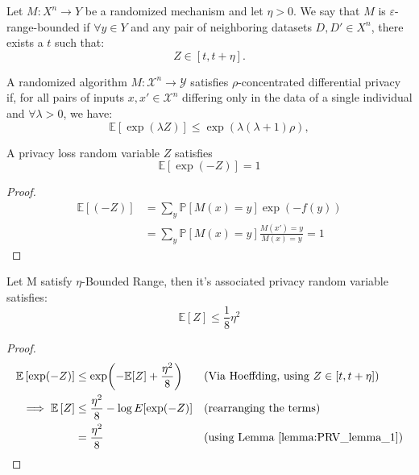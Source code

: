 \documentclass{article}
\begin{document}
\begin{definition}
\label{def:br}
    Let $M : X^n \to Y$ be a randomized mechanism and let $\eta > 0$. 
    We say that $M$ is $\varepsilon$-range-bounded if $\forall y \in Y$ 
    and any pair of neighboring datasets $D, D' \in X^n$, there exists a $t$ such that:
    \begin{equation}
        Z \in \left[t, t + \eta \right].
    \end{equation}
\end{definition}

\begin{definition}
    \label{def:zcdp}
    A randomized algorithm \( M : \mathcal{X}^n \to \mathcal{Y} \) satisfies \(\rho\)-concentrated differential privacy if, for all pairs of inputs \( x, x' \in \mathcal{X}^n \) differing only in the data of a single individual and $\forall \lambda > 0$, we have:
    \begin{equation}
        \mathbb{E}\left[\exp(\lambda Z)\right] \le \exp\left(\lambda(\lambda+1)\rho\right),
    \end{equation}
\end{definition}

\begin{lemma} A privacy loss random variable $Z$ satisfies
    \label{lemma:PRV_lemma_1}
    \begin{equation}
        \mathbb{E}\left[\exp(-Z)\right] = 1
    \end{equation}
    \begin{proof}
    \begin{align}
        \mathbb{E}\left[(-Z)\right] &= \sum_y \mathbb{P}\left[ M(x) = y\right] \exp(-f(y)) \\
        & = \sum_y \mathbb{P}\left[M(x) = y\right] \frac{M(x') = y}{M(x) = y} = 1
    \end{align}
    \end{proof}
\end{lemma}

\begin{lemma} Let M satisfy $\eta$-Bounded Range, then it's associated privacy random variable satisfies:
    \label{lemma:PRV_lemma_2}
    \begin{equation}
        \mathbb{E}\left[Z\right] \leq \frac{1}{8}\eta^2
    \end{equation}

    \begin{proof}
    \begin{align}
        \mathbb{E}\left[\exp(-Z)\right] & \leq \exp(-\mathbb{E}[Z] + \frac{\eta^2}{8}) && (\text{Via Hoeffding, using } Z \in [t, t+\eta]) \\
        \implies \mathbb{E}\left[Z\right] & \leq \frac{\eta^2}{8} - \log{E[\exp(-Z)]} && (\text{rearranging the terms}) \\
        & = \frac{\eta^2}{8} && (\text{using Lemma \ref{lemma:PRV_lemma_1}})
    \end{align}
    \end{proof}
\end{lemma}
\end{document}
